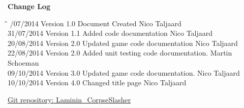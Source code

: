 \documentclass[letterpaper]{article}
\begin{document}
\begin{titlepage}
\begin{center}
\end{center}
\vfill %

\end{titlepage}


	\newpage
		{\LARGE \bf Change Log}\\[2em]
		
		\begin{tabbing}
			\hspace*{2.5cm}\=\hspace*{2.5cm}\=\hspace*{8cm}\=\hspace*{3cm} /07/2014	\> Version 1.0	\> Document Created 							\> Nico Taljaard \\
			31/07/2014  \> Version 1.1  \> Added code documentation						\> Nico Taljaard\\
			20/08/2014  \> Version 2.0  \> Updated game code documentation				\> Nico Taljaard\\
			22/08/2014  \> Version 2.0  \> Added unit testing code documentation.		\> Martin Schoeman\\
			09/10/2014	\> Version 3.0	\> Updated game code documentation.				\> Nico Taljaard\\
			10/10/2014	\> Version 4.0	\> Changed title page							\> Nico Taljaard\\
		\end{tabbing}
		
	\newpage
		\renewcommand\contentsname{TABLE OF CONTENTS}
		\newcommand\contentsnameLC{\colorbox{black}{\makebox[\textwidth-2\fboxsep][l]{\bfseries\color{red} Table of Contents}}}
		
		\renewcommand{\cftdot}{}
		\hypersetup{linktocpage}
		\tableofcontents
		
		\begin{flushleft}
			\LARGE\href{https://github.com/njTaljaard/Laminin_CorpseSlasher/}{Git repository: Laminin\_CorpseSlasher}
		\end{flushleft}
		
		\newpage
		
		\section*{\colorbox{black}{}} 
				\vspace{0.1in}
				
\end{document}
